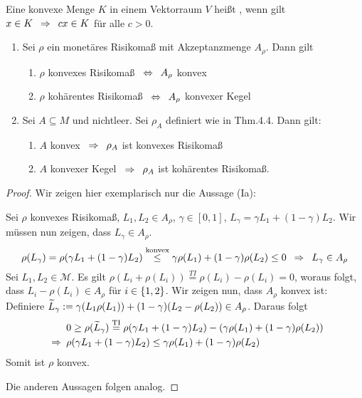 \begin{*definition}
	Eine konvexe Menge $K$ in einem Vektorraum $V$ heißt , wenn gilt $x \in K \enskip \Rightarrow \enskip c x \in K$ für alle $c > 0$.
\end{*definition}

\begin{theorem}
	\begin{enumerate}[label=\Roman*., leftmargin=*, nolistsep]
		\item Sei $\rho$ ein monetäres Risikomaß mit Akzeptanzmenge $A_\rho$. Dann gilt
		\begin{enumerate}[label=(\alph*)]
			\item $\rho$ konvexes Risikomaß $\enskip \Leftrightarrow \enskip A_\rho$ konvex
			\item $\rho$ kohärentes Risikomaß $\enskip \Leftrightarrow \enskip A_\rho$ konvexer Kegel
		\end{enumerate} 
		\item Sei $A \subseteq M$ und nichtleer. Sei $\rho_A$ definiert wie in Thm.4.4. Dann gilt:
		\begin{enumerate}[label=(\alph*)]
			\item $A$ konvex $\enskip \Rightarrow \enskip \rho_A$ ist konvexes Risikomaß
			\item $A$ konvexer Kegel $\enskip \Rightarrow \enskip \rho_A$ ist kohärentes Risikomaß.
		\end{enumerate}
	\end{enumerate}
\end{theorem}
\begin{proof}
	Wir zeigen hier exemplarisch nur die Aussage (Ia):
	\begin{proof-equivalence}
		\hinrichtung Sei $\rho$ konvexes Risikomaß, $L_1, L_2 \in A_\rho$, $\gamma \in [0,1]$, $L_\gamma = \gamma L_1 + (1-\gamma) L_2$. Wir müssen nun zeigen, dass $L_\gamma \in A_\rho$.
		\begin{equation*}
			\rho(L_\gamma) = \rho(\gamma L_1 + (1-\gamma) L_2) \overset{\text{konvex}}{\le} \gamma \rho(L_1) + (1-\gamma) \rho(L_2) \le 0 \enskip \Rightarrow \enskip L_\gamma \in A_\rho
		\end{equation*}
		\rueckrichtung Sei $L_1, L_2 \in \mathcal{M}$. Es gilt $\rho(L_i + \rho(L_i)) \overset{TI}{=} \rho(L_i) - \rho(L_i) = 0$, woraus folgt, dass $L_i - \rho(L_i) \in A_\rho$ für $i \in \left\{ 1,2 \right\}$. Wir zeigen nun, dass $A_\rho$ konvex ist: Definiere $\widetilde{L}_\gamma \mathrel{:=} \gamma(L_1  \rho(L_1)) + (1-\gamma)(L_2 - \rho(L_2)) \in A_\rho$. Daraus folgt
		\begin{equation*}
			\begin{aligned}
			&0 \ge \rho(\widetilde{L}_\gamma) \overset{\text{TI}}{=} \rho(\gamma L_1 + (1-\gamma) L_2) - \left( \gamma \rho(L_1) + (1-\gamma)\rho(L_2) \right) \\
			\enskip \Rightarrow \enskip &\rho(\gamma L_1 + (1-\gamma) L_2) \le \gamma \rho(L_1) + (1-\gamma) \rho(L_2)
			\end{aligned}
		\end{equation*}
		Somit ist $\rho$ konvex.
	\end{proof-equivalence}
	Die anderen Aussagen folgen analog.
\end{proof}

